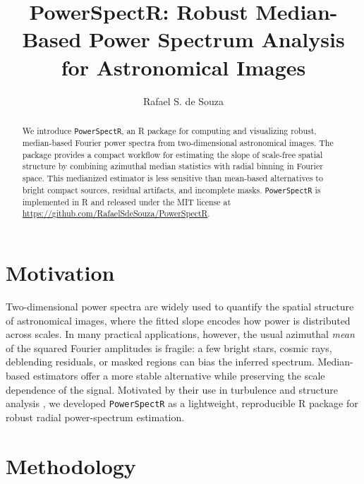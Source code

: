 \documentclass[RNAAS]{aastex631}
\begin{document}
\title{PowerSpectR: Robust Median-Based Power Spectrum Analysis for Astronomical Images}


\author[0000-0001-7207-4584]{Rafael S. de Souza}

\begin{abstract}
We introduce \texttt{PowerSpectR}, an \textsf{R} package for computing and visualizing robust, median-based Fourier power spectra from two-dimensional astronomical images. The package provides a compact workflow for estimating the slope of scale-free spatial structure by combining azimuthal median statistics with radial binning in Fourier space. This medianized estimator is less sensitive than mean-based alternatives to bright compact sources, residual artifacts, and incomplete masks. \texttt{PowerSpectR} is implemented in \textsf{R} and released under the MIT license at \url{https://github.com/RafaelSdeSouza/PowerSpectR}.
\end{abstract}


\section{Motivation}

Two-dimensional power spectra are widely used to quantify the spatial structure of astronomical images, where the fitted slope encodes how power is distributed across scales. In many practical applications, however, the usual azimuthal \emph{mean} of the squared Fourier amplitudes is fragile: a few bright stars, cosmic rays, deblending residuals, or masked regions can bias the inferred spectrum. Median-based estimators offer a more stable alternative while preserving the scale dependence of the signal. Motivated by their use in turbulence and structure analysis \citep[e.g.,][]{Burkhart2013}, we developed \texttt{PowerSpectR} as a lightweight, reproducible \textsf{R} package for robust radial power-spectrum estimation.

\section{Methodology}
\end{document}
